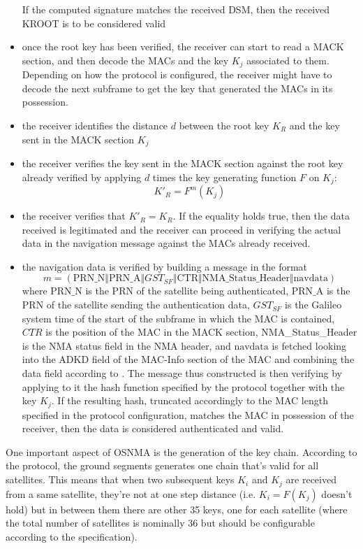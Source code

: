 \begin{itemize}
If the computed signature matches the received DSM, then the received KROOT is
to be considered valid
\item once the root key has been verified, the receiver can start to read a MACK
section, and then decode the MACs and the key $K_j$ associated to them.
Depending on how the protocol is configured, the receiver might have to decode
the next subframe to get the key that generated the MACs in its possession.
\item the receiver identifies the distance $d$ between the root key $K_R$ and
the key sent in the MACK section $K_j$
\item the receiver verifies the key sent in the MACK section against the root
key already verified by applying $d$ times the key generating function $F$ on
$K_j$:
\[
K'_R = F^m(K_j)
\]
\item the receiver verifies that $K'_R = K_R$. If the equality holds true, then
the data received is legitimated and the receiver can proceed in verifying the
actual data in the navigation message against the MACs already received.
\item the navigation data is verified by building a message in the format
\[
m = (\text{PRN\_N} \Vert \text{PRN\_A} \Vert GST_{SF} \Vert \text{CTR} \Vert
\text{NMA\_Status\_Header} \Vert \text{navdata})
\]
where $\text{PRN\_N}$ is the PRN of the satellite being authenticated,
$\text{PRN\_A}$ is the PRN of the satellite sending the authentication data,
$GST_{SF}$ is the Galileo system time of the start of the subframe in which the
MAC is contained, $CTR$ is the position of the MAC in the MACK section,
NMA\_Status\_Header is the NMA status field in the NMA header, and
$\text{navdata}$ is fetched looking into the ADKD field of the MAC-Info section
of the MAC and combining the data field according to \cite{osnma}. The message
thus constructed is then verifying by applying to it the hash function specified
by the protocol together with the key $K_j$. If the resulting hash, truncated
accordingly to the MAC length specified in the protocol configuration, matches
the MAC in possession of the receiver, then the data is considered authenticated
and valid.
\end{itemize}

\par

One important aspect of OSNMA is the generation of the key chain. According to
the protocol, the ground segments generates one chain that's valid for all
satellites. This means that when two subsequent keys $K_i$ and $K_j$ are
received from a same satellite, they're not at one step distance (i.e. $K_i =
F(K_j)$ doesn't hold) but in between them there are other 35 keys, one for each
satellite (where the total number of satellites is nominally 36 but should be
configurable according to the specification).
